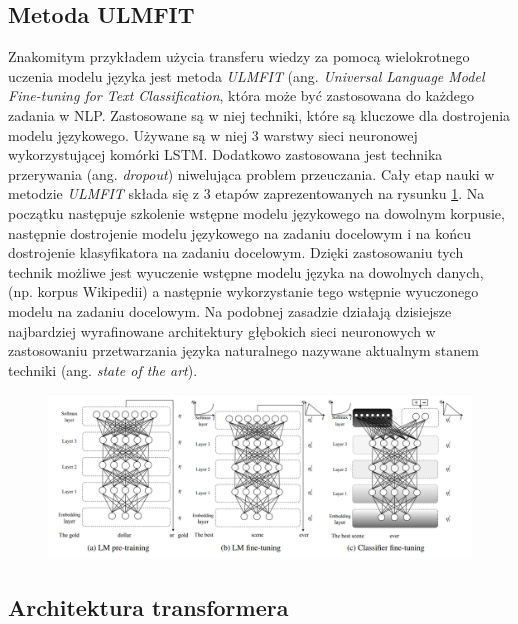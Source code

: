 \subsection{Metoda ULMFIT}

Znakomitym przykładem użycia transferu wiedzy za pomocą wielokrotnego uczenia modelu języka jest metoda \textit{ULMFIT} \cite{howard2018universal} (ang. \textit{Universal Language Model Fine-tuning for Text Classification}, która może być zastosowana do każdego zadania w NLP. Zastosowane są w niej techniki, które są kluczowe dla dostrojenia modelu językowego. Używane są w niej 3 warstwy sieci neuronowej wykorzystującej komórki LSTM. Dodatkowo zastosowana jest technika przerywania (ang. \textit{dropout}) niwelująca problem przeuczania. Cały etap nauki w metodzie \textit{ULMFIT} składa się z 3 etapów zaprezentowanych na rysunku \ref{rys:ulmfit}. Na początku następuje szkolenie wstępne modelu językowego na dowolnym korpusie, następnie dostrojenie modelu językowego na zadaniu docelowym i na końcu dostrojenie klasyfikatora na zadaniu docelowym. Dzięki zastosowaniu tych technik możliwe jest wyuczenie wstępne modelu języka na dowolnych danych, (np. korpus Wikipedii) a następnie wykorzystanie tego wstępnie wyuczonego modelu na zadaniu docelowym. Na podobnej zasadzie działają dzisiejsze najbardziej wyrafinowane architektury głębokich sieci neuronowych w zastosowaniu przetwarzania języka naturalnego nazywane aktualnym stanem techniki (ang. \textit{state of the art}).

\begin{figure}[t]
\centering\includegraphics[width=\textwidth]{figures/ulmfit.png}
\label{rys:ulmfit}
\end{figure}

\subsection{Architektura transformera}

